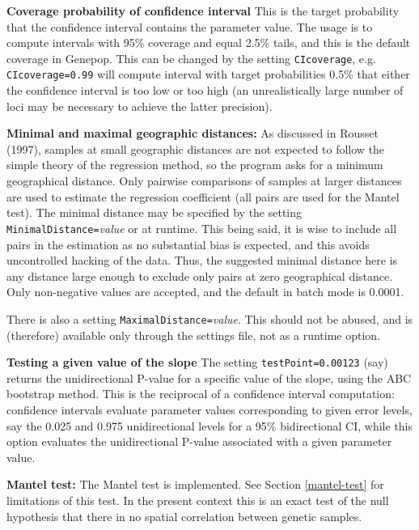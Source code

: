 \documentclass[12pt,]{book}
\begin{document}
\textbf{Coverage probability of confidence interval} This is the target
probability that the confidence interval contains the parameter value.
The usage is to compute intervals with 95\% coverage and equal 2.5\%
tails, and this is the default coverage in Genepop. This can be changed
by the setting \texttt{CIcoverage}, e.g. \texttt{CIcoverage=0.99} will
compute interval with target probabilities 0.5\% that either the
confidence interval is too low or too high (an unrealistically large
number of loci may be necessary to achieve the latter
precision).

\textbf{Minimal and maximal geographic distances:} As discussed in
Rousset (1997), samples at small geographic distances are not expected
to follow the simple theory of the regression method, so the program
asks for a minimum geographical distance. Only pairwise comparisons of
samples at larger distances are used to estimate the regression
coefficient (all pairs are used for the Mantel test). The minimal
distance may be specified by the setting
\texttt{MinimalDistance=}\emph{value} or
at runtime. This being said, it is wise to include all pairs in the
estimation as no substantial bias is expected, and this avoids
uncontrolled hacking of the data. Thus, the suggested minimal distance
here is any distance large enough to exclude only pairs at zero
geographical distance. Only non-negative values are accepted, and the
default in batch mode is 0.0001.

There is also a setting
\texttt{MaximalDistance=}\emph{value}.
This should not be abused, and is (therefore) available only through the
settings file, not as a runtime option.

\textbf{Testing a given value of the slope} The setting
\texttt{testPoint=0.00123} (say) returns the unidirectional P-value for
a specific value of the slope, using the ABC bootstrap method. This is
the reciprocal of a confidence interval computation: confidence
intervals evaluate parameter values corresponding to given error levels,
say the 0.025 and 0.975 unidirectional levels for a 95\% bidirectional
CI, while this option evaluates the unidirectional P-value associated
with a given parameter value.

\textbf{Mantel test:} The Mantel test is implemented.
See Section \ref{mantel-test} for limitations of this test. In the
present context this is an exact test of the null hypothesis that there
in no spatial correlation between genetic samples.
\end{document}
